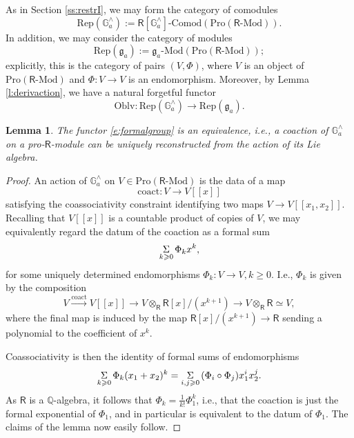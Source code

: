 \documentclass{amsart}
\newtheorem{Lem}[Thm]{Lemma}
\theoremstyle{definition}
\newcommand{\comod}{\text{-Comod}}
\newcommand{\Rep}{\on{Rep}}
\newcommand{\Pro}{\on{Pro}}
\newcommand{\fg}{\mathfrak{g}}
\renewcommand{\mod}{\text{-}\on{Mod}}
\newcommand{\on}{\mathrm}
\newcommand{\Ring}{\mathsf{R}}
\numberwithin{equation}{section}
\begin{document}
As in Section \ref{ss:restrI}, we may form the category of comodules 
$$\on{Rep}(\mathbb{G}_a^\wedge) := \Ring[\mathbb{G}_a^\wedge]\comod(\Pro(\Ring\mod)).$$
In addition, we may consider the category of modules 
$$\Rep(\mathfrak{g}_a) := \mathfrak{g}_a\mod(\Pro(\Ring\mod));$$
explicitly, this is the category of pairs $(V, \Phi)$, where $V$ is an object of $\Pro(\Ring\mod)$ and $\Phi: V \rightarrow V$ is an endomorphism. Moreover, by Lemma \ref{l:derivaction}, we have a natural forgetful functor 
\begin{equation} \label{e:formalgroup} \on{Oblv}: \Rep(\mathbb{G}_a^\wedge) \rightarrow \Rep(\fg_a). \end{equation}

\begin{Lem} \label{l:formalga} The functor \eqref{e:formalgroup} is an equivalence, i.e., a coaction of $\mathbb{G}_a^\wedge$ on a pro-$\Ring$-module can be uniquely reconstructed from the action of its Lie algebra.
\end{Lem}

\begin{proof} An action of $\mathbb{G}_a^\wedge$ on $V \in \Pro(\Ring\mod)$ is the data of a map 
$$\on{coact}: V \rightarrow V[[x]]$$
satisfying the coassociativity constraint identifying two maps $V \rightarrow V[[x_1, x_2]]$. Recalling that $V[[x]]$ is a countable product of copies of $V$, we may equivalently regard the datum of the coaction as a formal sum 
$$\underset{k \geqslant 0} \Sigma \hspace{.5mm} \Phi_k x^k,$$
for some uniquely determined endomorphisms $\Phi_k: V \rightarrow V, k \geqslant 0$. I.e.,  $\Phi_k$ is given by the composition 
$$V \xrightarrow{\on{coact}} V[[x]] \rightarrow V \otimes_\Ring \Ring[x]/(x^{k+1}) \rightarrow V \otimes_\Ring \Ring \simeq V,$$
where the final map is induced by the map $\Ring[x]/(x^{k+1}) \rightarrow \Ring$ sending a polynomial to the coefficient of $x^k$. 

Coassociativity is then the identity of formal sums of endomorphisms
$$\underset{k \geqslant 0} \Sigma \hspace{.5mm}   \Phi_k (x_1 + x_2)^k = \underset{i,j \geqslant 0} \Sigma  \hspace{.5mm} (\Phi_i \circ \Phi_j) x_1^i x_2^j.$$
As $\Ring$ is a $\mathbb{Q}$-algebra, it follows that $\Phi_k = \frac{1}{k!} \Phi_1^k$, i.e., that the coaction is just the formal exponential of $\Phi_1$, and in particular is equivalent to the datum of $\Phi_1$. The claims of the lemma now easily follow. 
\end{proof}
\end{document}
